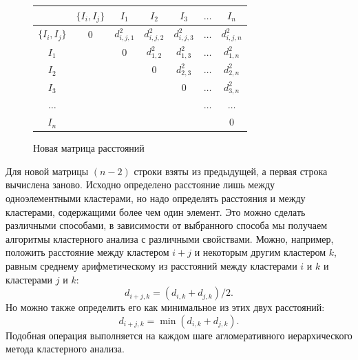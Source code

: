 \documentclass[a4paper,14pt,openany,final]{extreport} %
\def\oldcaption{} \let\oldcaption=\caption
\def\caption{\stepcounter{captionsnum}\oldcaption}
\begin{document}
{\begin{figure}[htbp]
  \centering
  \begin{tabular}{|c||c|c|c|c|c|c|}
    \hline
                  & $\{I_i,I_j\}$ & $I_1$         & $I_2$         & $I_3$         & $\ldots$ & $I_n$        \\
    \hline
    \hline
    $\{I_i,I_j\}$ &  0            & $d_{i,j,1}^2$ & $d_{i,j,2}^2$ & $d_{i,j,3}^2$ & $\ldots$ & $d_{i,j,n}^2$  \\
    \hline
    $I_1$ & & 0     & $d_{1,2}^2$ & $d_{1,3}^2$ & $\ldots$ & $d_{1,n}^2$  \\
    \hline
    $I_2$ & &      & 0           & $d_{2,3}^2$ & $\ldots$ & $d_{2,n}^2$  \\
    \hline
    $I_3$ & &      &             & 0           & $\ldots$ & $d_{3,n}^2$  \\
    \hline
 $\ldots$ & &      &             &             & $\ldots$ & $\ldots$ \\
    \hline
    $I_n$ & &      &             &             &          & 0  \\
    \hline
  \end{tabular}
  \caption{Новая матрица расстояний}
  \label{fig:disssimmnew}
\end{figure}
Для новой матрицы $(n-2)$ строки взяты из предыдущей, а первая строка вычислена заново. Исходно определено расстояние лишь между одноэлементными кластерами, но надо определять расстояния и между кластерами, содержащими более чем один элемент. Это можно сделать различными способами, в зависимости от выбранного способа мы получаем алгоритмы кластерного анализа с различными свойствами. Можно, например, положить расстояние между кластером $i + j$ и некоторым другим кластером $k$, равным среднему арифметическому из расстояний между кластерами $i$ и $k$ и кластерами $j$ и $k$:
\[d_{i+j,k}=(d_{i,k}+d_{j,k})/2.\]
Но можно также определить его как минимальное из этих двух расстояний:
\[d_{i+j,k}=\min⁡(d_{i,k}+d_{j,k}).\]
Подобная операция выполняется на каждом шаге агломеративного иерархического метода кластерного анализа.

}
\end{document}
